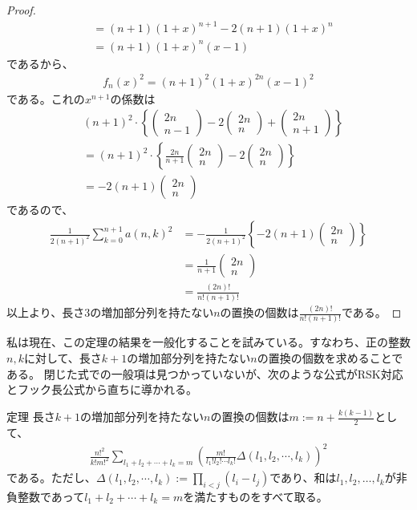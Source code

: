 \documentclass[a4paper,11pt]{jsarticle}
\theoremstyle{plain}
\theoremstyle{definition}
\renewcommand{\(}{\left(}
\renewcommand{\)}{\right)}
\renewcommand{\[}{\left[}
\renewcommand{\]}{\right]}
\renewcommand{\{}{\left\lbrace}
\renewcommand{\}}{\right\rbrace}
\newcommand{\pmat}[1]{\begin{pmatrix} #1 \end{pmatrix}}
\begin{document}
\begin{proof}
\begin{align*}
        &= (n+1) (1+x)^{n+1} - 2(n+1)  (1+x)^{n} \\
        &= (n+1) (1+x)^{n} (x-1)
    \end{align*}
    であるから、
    \begin{align*}
        f_n(x)^2 = (n+1)^2 (1+x)^{2n} (x-1)^2
    \end{align*}
    である。これの$x^{n+1}$の係数は
    \begin{align*}
        & (n+1)^2 \cdot \{ \pmat{2n \\ n-1} -2 \pmat{2n \\ n} + \pmat{2n \\ n+1}\} \\
        &= (n+1)^2 \cdot \{ \frac{2n}{n+1}\pmat{2n \\ n} - 2\pmat{2n \\ n}\} \\
        &= - 2(n+1) \pmat{2n \\ n}
    \end{align*}
    であるので、
    \begin{align*}
        \frac{1}{2(n+1)^2} \sum_{k=0}^{n+1} a(n,k)^2 &= -\frac{1}{2(n+1)^2} \{- 2(n+1) \pmat{2n \\ n}\}  \\
        &= \frac{1}{n+1} \pmat{2n \\ n} \\
        &= \frac{(2n)!}{n!(n+1)!}
    \end{align*}
    以上より、長さ$3$の増加部分列を持たない$n$の置換の個数は$\displaystyle \frac{(2n)!}{n!(n+1)!}$である。
\end{proof}

私は現在、この定理の結果を一般化することを試みている。すなわち、正の整数$n,k$に対して、長さ$k+1$の増加部分列を持たない$n$の置換の個数を求めることである。
閉じた式での一般項は見つかっていないが、次のような公式がRSK対応とフック長公式から直ちに導かれる。

\begin{itembox}[l]{定理}
    長さ$k+1$の増加部分列を持たない$n$の置換の個数は$m := n + \frac{k(k-1)}{2}$として、
    \begin{align*}
        \frac{n!^2}{k! m!^2} \sum_{l_1+l_2+\cdots+l_k = m} \( \frac{m!}{l_1! l_2! \cdots l_k!} \Delta(l_1, l_2, \cdots, l_k) \)^2
    \end{align*}
    である。ただし、$\Delta(l_1, l_2, \cdots, l_k) := \prod_{i<j} (l_i - l_j)$であり、和は$l_1, l_2, \ldots, l_k$が非負整数であって$l_1 + l_2 + \cdots + l_k = m$を満たすものをすべて取る。
\end{itembox}
\end{document}
